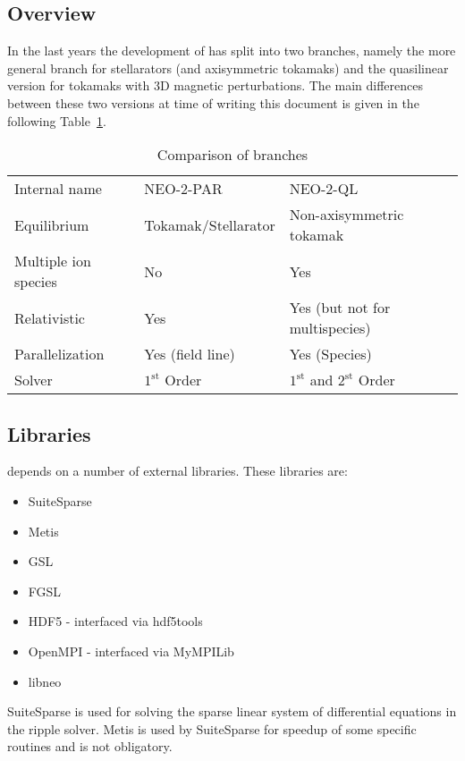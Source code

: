 \documentclass{article}
\newcommand{\vv}[1]{\texttt{\detokenize{#1}}}
\begin{document}
\subsection{Overview}
In the last years the development of \vv{NEO-2} has split into two branches,
namely the more general branch for stellarators (and axisymmetric
tokamaks) and the quasilinear version for tokamaks with 3D magnetic
perturbations. The main differences between these two versions at time
of writing this document is given in the following Table~\ref{tab:neo2branches}.

\begin{table}[h]
\centering
\begin{tabular}{lll}
Internal name   & NEO-2-PAR & NEO-2-QL\\
Equilibrium     & Tokamak/Stellarator & Non-axisymmetric tokamak\\
Multiple ion species & No & Yes\\
Relativistic    & Yes & Yes (but not for multispecies)\\
Parallelization & Yes (field line) & Yes (Species)\\
Solver          & $1^\mathrm{st}$ Order & $1^\mathrm{st}$ and $2^\mathrm{st}$ Order%
\end{tabular}
\caption{Comparison of \vv{NEO-2} branches}
\label{tab:neo2branches}
\end{table}

\subsection{Libraries\label{technicalbackground_libraries}}
\vv{NEO-2} depends on a number of external libraries. These libraries
are:
\begin{itemize}
\item SuiteSparse
\item Metis
\item GSL
\item FGSL
\item HDF5 - interfaced via hdf5tools
\item OpenMPI - interfaced via MyMPILib
\item libneo
\end{itemize}

SuiteSparse is used for solving the sparse linear system of differential
equations in the ripple solver. Metis is used by SuiteSparse for speedup
of some specific routines and is not obligatory.
\end{document}
